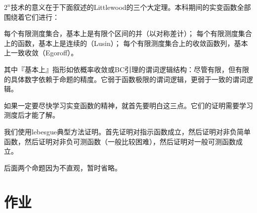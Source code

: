$2^n$技术的意义在于下面叙述的Littlewood的三个大定理。本科期间的实变函数全部围绕着它们进行：

\begin{wxlb}
\tiao 每个有限测度集合，基本上是有限个区间的并（以对称差计）；
\tiao 每个有限测度集合上的函数，基本上是连续的（Lusin）；
\tiao 每个有限测度集合上的收敛函数列，基本上一致收敛（Egoroff）。
\end{wxlb}

其中『基本上』指形如依概率收敛或BC引理的谓词逻辑结构：尽管有限，但有限的具体数字依赖于命题的精度。它弱于函数极限的谓词逻辑，更弱于一致的谓词逻辑。

如果一定要尽快学习实变函数的精神，就首先要明白这三点。它们的证明需要学习测度后才能了解。


我们使用lebesgue典型方法证明。首先证明对指示函数成立，然后证明对非负简单函数，然后证明对非负可测函数（一般比较困难），然后证明对一般可测函数成立。

后面两个命题因为不直观，暂时省略。


\section{作业}

